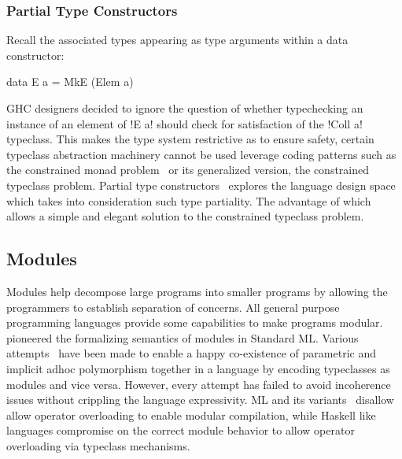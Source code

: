 \documentclass[screen,nonacm,manuscript,review]{acmart} %
\begin{document}
\subsubsection{Partial Type Constructors}
Recall the associated types appearing as type arguments within a data
constructor:

\begin{CenteredBox}
\begin{code}
data E a = MkE (Elem a)
\end{code}
\end{CenteredBox}

GHC designers decided to ignore the question of whether typechecking
an instance of an element of !E a! should check for satisfaction of
the !Coll a! typeclass. This makes the type system restrictive as to
ensure safety, certain typeclass abstraction machinery cannot be used
leverage coding patterns such as the constrained monad
problem~\cite{sculthorpe_constrained-monad_2013} or its generalized
version, the constrained typeclass problem. Partial type
constructors~\cite{jones_partial_2019,ingle_partial_2022} explores the language design
space which takes into consideration such type partiality. The
advantage of which allows a simple and elegant solution to the
constrained typeclass problem.

\subsection{Modules}\label{sec:rw-modules}
Modules help decompose large programs into smaller programs by allowing the programmers to establish separation of concerns. All general purpose programming languages provide some capabilities to make programs modular. ~\citet{macqueen_modules_1984} pioneered the formalizing semantics of modules in Standard ML.
Various attempts~\cite{dreyer_modular_2007, wehr_ml_2008, white_modular_2014} have been made to enable a happy co-existence of parametric and implicit adhoc polymorphism together in a language by encoding typeclasses as modules and vice versa. However, every attempt has failed to avoid incoherence issues without crippling the language expressivity. ML and its variants~\cite{milner_definition_1997,leroy_ocaml_2023} disallow allow operator overloading to enable modular compilation, while Haskell like languages compromise on the correct module behavior to allow operator overloading via typeclass mechanisms.
\end{document}
